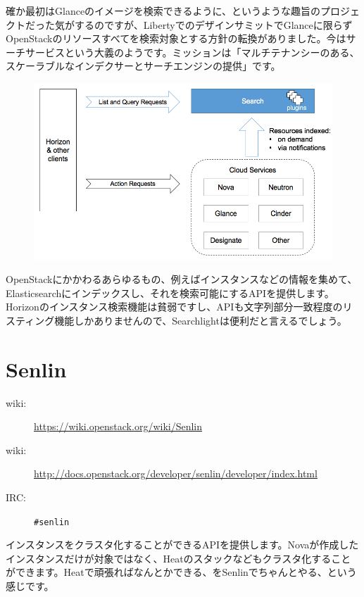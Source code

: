 確か最初はGlanceのイメージを検索できるように、というような趣旨のプロジェクトだった気がするのですが、LibertyでのデザインサミットでGlanceに限らずOpenStackのリソースすべてを検索対象とする方針の転換がありました。今はサーチサービスという大義のようです。ミッションは「マルチテナンシーのある、スケーラブルなインデクサーとサーチエンジンの提供」です。

\begin{figure}[htb]
	\begin{center}
		\includegraphics[width=\textwidth]{img/Searchlight-Concept-1.png}
	\end{center}
\end{figure}

OpenStackにかかわるあらゆるもの、例えばインスタンスなどの情報を集めて、Elasticsearchにインデックスし、それを検索可能にするAPIを提供します。Horizonのインスタンス検索機能は貧弱ですし、APIも文字列部分一致程度のリスティング機能しかありませんので、Searchlightは便利だと言えるでしょう。

\section{Senlin}

\begin{description}
	\item[wiki:] \url{https://wiki.openstack.org/wiki/Senlin}
	\item[wiki:] \url{http://docs.openstack.org/developer/senlin/developer/index.html}
	\item[IRC:] \verb|#senlin|
\end{description}

インスタンスをクラスタ化することができるAPIを提供します。Novaが作成したインスタンスだけが対象ではなく、Heatのスタックなどもクラスタ化することができます。Heatで頑張ればなんとかできる、をSenlinでちゃんとやる、という感じです。


